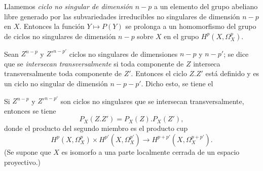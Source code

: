 Llamemos \emph{ciclo no singular de dimensión $n-p$} a un elemento del grupo
abeliano libre generado por las subvariedades irreducibles no singulares de
dimensión $n-p$ en $X$. Entonces la función $Y\longmapsto P(Y)$ se prolonga a
un homomorfismo del grupo de ciclos no singulares de dimensión $n-p$ sobre $X$
en el grupo $H^{p}(X,\Omega_X^{p})$.

Sean $Z^{n-p}$ y $Z'^{n-p'}$ ciclos no singulares de dimensiones $n-p$ y
$n-p'$; se dice que se \emph{intersecan transversalmente} si toda componente
de $Z$ interseca transversalmente toda componente de $Z'$. Entonces el ciclo $Z.Z'$ está
definido y es un ciclo no singular de dimensión $n-p-p'$. Dicho esto, se tiene el

 Si $Z^{n-p}$ y $Z'^{n-p'}$ son ciclos no singulares
que se intersecan transversalmente, entonces se tiene
\begin{equation}\tag{4.4}
  P_X(Z.Z')=P_X(Z).P_X(Z'),
\end{equation}
donde el producto del segundo miembro es el producto cup
\[
  H^{p}(X,\Omega_X^{p})\times H^{p'}(X,\Omega_X^{p'})
  \longrightarrow H^{p+p'}(X,\Omega_X^{p+p'}).
\]
(Se supone que $X$ es isomorfo a una parte localmente cerrada de un espacio
proyectivo.)

